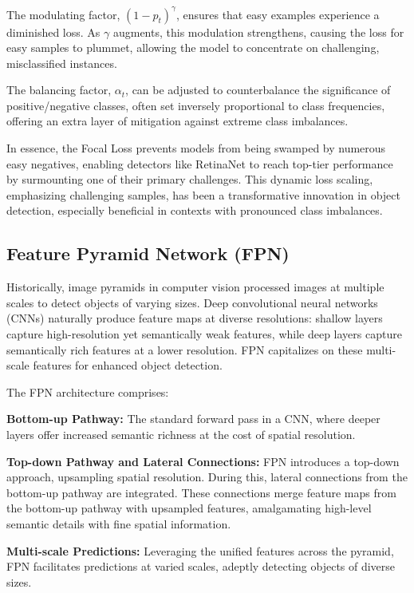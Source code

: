 \documentclass{article}
\begin{document}
The modulating factor, \( (1 - p_t)^\gamma \), ensures that easy examples experience a diminished loss. As \( \gamma \) augments, this modulation strengthens, causing the loss for easy samples to plummet, allowing the model to concentrate on challenging, misclassified instances.

The balancing factor, \( \alpha_t \), can be adjusted to counterbalance the significance of positive/negative classes, often set inversely proportional to class frequencies, offering an extra layer of mitigation against extreme class imbalances.

In essence, the Focal Loss prevents models from being swamped by numerous easy negatives, enabling detectors like RetinaNet to reach top-tier performance by surmounting one of their primary challenges. This dynamic loss scaling, emphasizing challenging samples, has been a transformative innovation in object detection, especially beneficial in contexts with pronounced class imbalances.

\subsection{Feature Pyramid Network (FPN)}

Historically, image pyramids in computer vision processed images at multiple scales to detect objects of varying sizes. Deep convolutional neural networks (CNNs) naturally produce feature maps at diverse resolutions: shallow layers capture high-resolution yet semantically weak features, while deep layers capture semantically rich features at a lower resolution. FPN \cite{lin2017feature} capitalizes on these multi-scale features for enhanced object detection.

The FPN architecture comprises:

\textbf{Bottom-up Pathway:} The standard forward pass in a CNN, where deeper layers offer increased semantic richness at the cost of spatial resolution.

\textbf{Top-down Pathway and Lateral Connections:} FPN introduces a top-down approach, upsampling spatial resolution. During this, lateral connections from the bottom-up pathway are integrated. These connections merge feature maps from the bottom-up pathway with upsampled features, amalgamating high-level semantic details with fine spatial information.

\textbf{Multi-scale Predictions:} Leveraging the unified features across the pyramid, FPN facilitates predictions at varied scales, adeptly detecting objects of diverse sizes.
\end{document}
